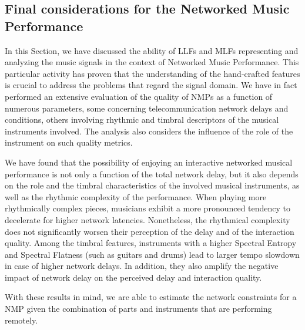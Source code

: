 \subsection{Final considerations for the Networked Music Performance}\label{sec:NMP:conclusions}
In this Section, we have discussed the ability of LLFs and MLFs representing and analyzing the music signals in the context of Networked Music Performance.
This particular activity has proven that the understanding of the hand-crafted features is crucial to address the problems that regard the signal domain.  We have in fact performed an extensive evaluation of the quality of NMPs as a function of numerous parameters, some concerning telecommunication network delays and conditions, others involving rhythmic and timbral descriptors of the musical instruments involved. The analysis also considers the influence of the role of the instrument on such quality metrics.

We have found that the possibility of enjoying an interactive networked musical performance is not only a function of the total network delay, but it also depends on the role and the timbral characteristics of the involved musical instruments, as well as the rhythmic complexity of the performance. When playing more rhythmically complex pieces, musicians exhibit a more pronounced tendency to decelerate for higher network latencies. Nonetheless, the rhythmical complexity does not significantly worsen their perception of the delay and of the interaction quality.
Among the timbral features, instruments with a higher Spectral Entropy and Spectral Flatness (such as guitars and drums) lead to larger tempo slowdown in case of higher network delays. In addition, they also amplify the negative impact of network delay on the perceived delay and interaction quality.

With these results in mind, we are able to estimate the network constraints for a NMP given the combination of parts and instruments that are performing remotely.

